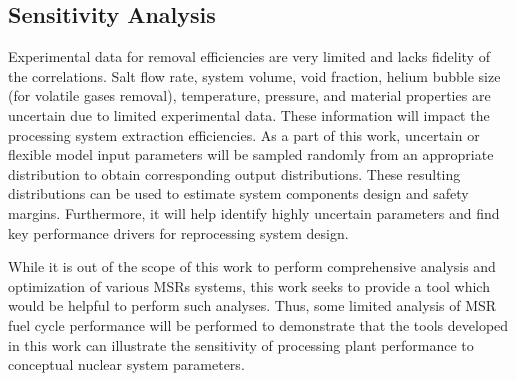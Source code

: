 \subsection{Sensitivity Analysis}
Experimental data for removal efficiencies are very limited and lacks 
fidelity of the correlations. Salt flow rate, system volume, 
void fraction, helium bubble size (for volatile gases removal), 
temperature, pressure, and material properties are uncertain due to 
limited experimental data. These information will impact the 
processing system extraction efficiencies. As a part of this work, 
uncertain or flexible model input parameters will be sampled randomly 
from an appropriate distribution to obtain corresponding output 
distributions. These resulting distributions can be used to estimate 
system components design and safety margins. Furthermore, it will 
help identify highly uncertain parameters and find key performance 
drivers for reprocessing system design.

While it is out of the scope of this work to perform
comprehensive analysis and optimization of various \glspl{MSR} 
systems, this 
work seeks to provide a tool which would be helpful to perform such 
analyses. Thus, some limited analysis of \gls{MSR} fuel cycle 
performance will be performed to demonstrate that the tools developed 
in this work can illustrate the sensitivity of processing plant 
performance to conceptual nuclear system parameters.
